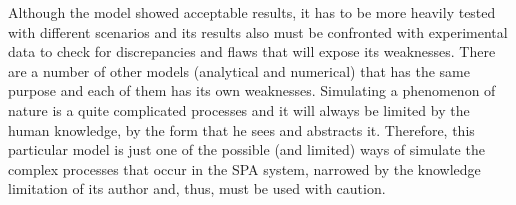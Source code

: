 Although the model showed acceptable results, it has to be more heavily tested with different scenarios and its results also must be confronted with experimental data to check for discrepancies and flaws that will expose its weaknesses.
There are a number of other models (analytical and numerical) that has the same purpose and each of them has its own weaknesses.
Simulating a phenomenon of nature is a quite complicated processes and it will always be limited by the human knowledge, by the form that he sees and abstracts it.
Therefore, this particular model is just one of the possible (and limited) ways of simulate the complex processes that occur in the SPA system, narrowed by the knowledge limitation of its author and, thus, must be used with caution.




{\tred
}

